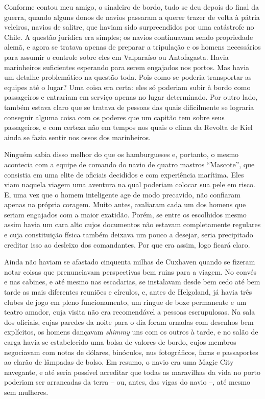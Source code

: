 Conforme contou meu amigo, o sinaleiro de bordo, tudo se deu depois do
final da guerra, quando alguns donos de navios passaram a querer trazer
de volta à pátria veleiros, navios de salitre, que haviam sido
surpreendidos por uma catástrofe no Chile. A questão jurídica era
simples; os navios continuavam sendo propriedade alemã, e agora se
tratava apenas de preparar a tripulação e os homens necessários para
assumir o controle sobre eles em Valparaíso ou Antofagasta. Havia
marinheiros suficientes esperando para serem engajados nos portos. Mas
havia um detalhe problemático na questão toda. Pois como se poderia
transportar as equipes até o lugar? Uma coisa era certa: eles só
poderiam subir à bordo como passageiros e entrariam em serviço apenas no
lugar determinado. Por outro lado, também estava claro que se tratava de
pessoas das quais dificilmente se lograria conseguir alguma coisa com os
poderes que um capitão tem sobre seus passageiros, e com certeza não em
tempos nos quais o clima da Revolta de Kiel ainda se fazia sentir nos
ossos dos marinheiros.

Ninguém sabia disso melhor do que os hamburgueses e, portanto, o mesmo
acontecia com a equipe de comando do navio de quatro mastros
``Mascote'', que consistia em uma elite de oficiais decididos e com
experiência marítima. Eles viam naquela viagem uma aventura na qual
poderiam colocar sua pele em risco. E, uma vez que o homem inteligente
age de modo precavido, não confiaram apenas na própria coragem. Muito
antes, avaliaram cada um dos homens que seriam engajados com a maior
exatidão. Porém, se entre os escolhidos mesmo assim havia um cara alto
cujos documentos não estavam completamente regulares e cuja constituição
física também deixava um pouco a desejar, seria precipitado creditar
isso ao desleixo dos comandantes. Por que era assim, logo ficará claro.

Ainda não haviam se afastado cinquenta milhas de Cuxhaven quando se
fizeram notar coisas que prenunciavam perspectivas bem ruins para a
viagem. No convés e nas cabines, e até mesmo nas escadarias, se
instalavam desde bem cedo até bem tarde as mais diferentes reuniões e
círculos, e, antes de Helgoland, já havia três clubes de jogo em pleno
funcionamento, um ringue de boxe permanente e um teatro amador,
cuja visita não era recomendável a pessoas escrupulosas. Na sala dos
oficiais, cujas paredes da noite para o dia foram ornadas com desenhos
bem explícitos, os homens dançavam \emph{shimmy} uns com os outros à tarde, e
no salão de carga havia se estabelecido uma bolsa de valores de bordo,
cujos membros negociavam com notas de dólares, binóculos, nus
fotográficos, facas e passaportes ao clarão de lâmpadas de bolso. Em
resumo, o navio era uma Magic City navegante, e até seria possível
acreditar que todas as maravilhas da vida no porto poderiam ser
arrancadas da terra -- ou, antes, das vigas do navio --, até mesmo sem
mulheres.


